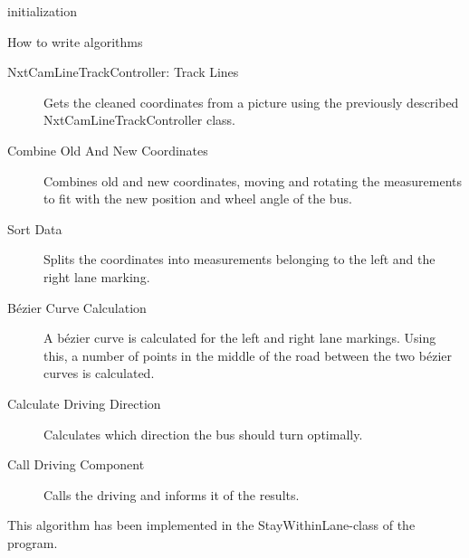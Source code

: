 \begin{algorithm}[H]
 initialization\;
 \caption{How to write algorithms}
\end{algorithm}








\begin{description}
    \item[NxtCamLineTrackController: Track Lines]
    Gets the cleaned coordinates from a picture using the previously described NxtCamLineTrackController class. 
    \item[Combine Old And New Coordinates]
    Combines old and new coordinates, moving and rotating the measurements to fit with the new position and wheel angle of the bus. 
    \item[Sort Data]
    Splits the coordinates into measurements belonging to the left and the right lane marking. 
    \item[Bézier Curve Calculation]
    A bézier curve is calculated for the left and right lane markings. Using this, a number of points in the middle of the road between the two bézier curves is calculated.
    \item[Calculate Driving Direction]
    Calculates which direction the bus should turn optimally. 
    \item[Call Driving Component]
    Calls the driving and informs it of the results.
\end{description}

This algorithm has been implemented in the StayWithinLane-class of the program. 



